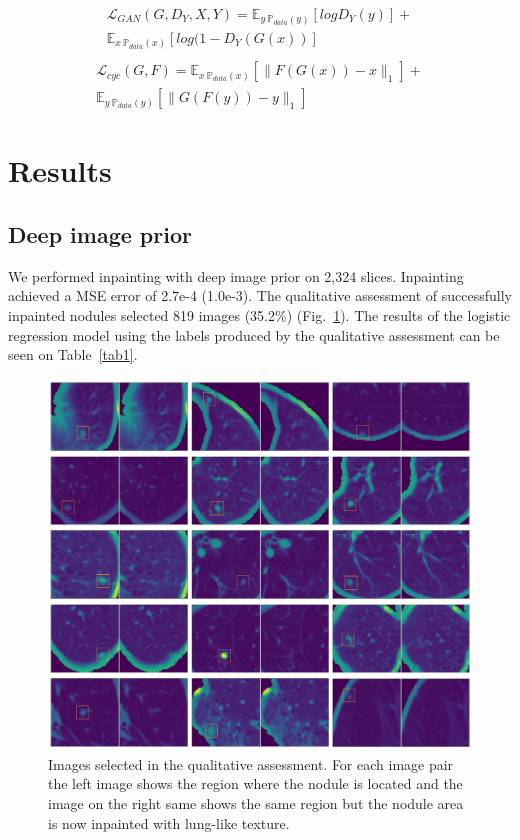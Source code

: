 \documentclass[runningheads]{llncs}
\begin{document}
\begin{equation}
\begin{aligned}
\mathcal{L}_{GAN}(G, D_Y, X, Y) = \mathbb{E}_{y~\mathbb{P}_{data}(y)} [log D_Y(y)] + \\
\mathbb{E}_{x~\mathbb{P}_{data}(x)} [log(1 - D_Y(G(x))]\\
\end{aligned}
\end{equation}
\begin{equation}
\begin{aligned}
\mathcal{L}_{cyc}(G, F) = \mathbb{E}_{x~\mathbb{P}_{data}(x)} [\|F(G(x)) - x\|_1] + \\
\mathbb{E}_{y~\mathbb{P}_{data}(y)} [\|G(F(y)) - y\|_1]
\end{aligned}
\end{equation}

\section{Results}
\subsection{Deep image prior}
We performed inpainting with deep image prior on 2,324 slices. Inpainting achieved a MSE error of 2.7e-4 (1.0e-3). The qualitative assessment of successfully inpainted nodules selected 819 images (35.2\%) (Fig.~\ref{fig3}). The results of the logistic regression model using the labels produced by the qualitative assessment can be seen on Table~\ref{tab1}.

\begin{figure}
\includegraphics[width=\textwidth]{inpainting-examples.png}
\caption{Images selected in the qualitative assessment. For each image pair the left image shows the region where the nodule is located and the image on the right same shows the same region but the nodule area is now inpainted with lung-like texture.} \label{fig3}
\end{figure}
\end{document}
